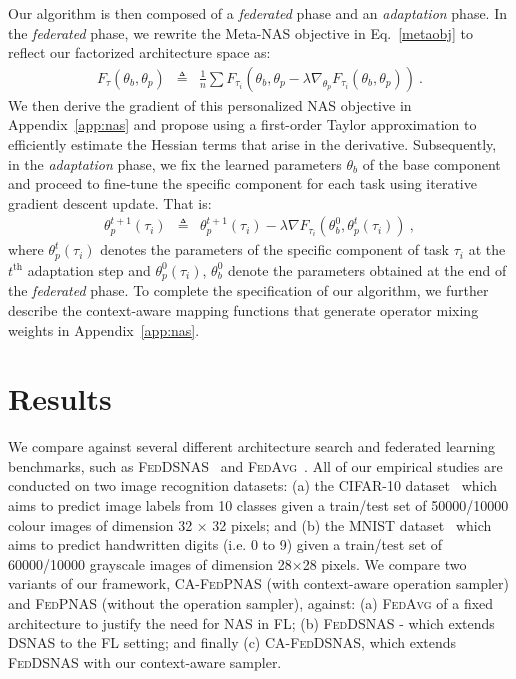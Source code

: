 \noindent Our algorithm is then composed of a \emph{federated} phase and an \emph{adaptation} phase. In the \emph{federated} phase, we rewrite the Meta-NAS objective in Eq.~\eqref{metaobj} to reflect our factorized architecture space as:
\begin{eqnarray}
F_\tau(\theta_b, \theta_p) &\triangleq& \frac{1}{n} \sum F_{\tau_i}\left(\theta_b, \theta_p - \lambda\nabla_{\theta_p} F_{\tau_i}(\theta_b, \theta_p)\right) \ .
\end{eqnarray}
We then derive the gradient of this personalized NAS objective in Appendix~\ref{app:nas} and propose using a first-order Taylor approximation to efficiently estimate the Hessian terms that arise in the derivative. Subsequently, in the \emph{adaptation} phase, we fix the learned parameters $\theta_b$ of the base component and proceed to fine-tune the specific component for each task using iterative gradient descent update. That is:
\begin{eqnarray}
\theta^{t+1}_p(\tau_i) &\triangleq& \theta^{t+1}_p(\tau_i) - \lambda \nabla F_{\tau_i}\left(\theta^0_b, \theta^t_p(\tau_i)\right) \ ,
\end{eqnarray}
where $\theta^{t}_p(\tau_i)$ denotes the parameters of the specific component of task $\tau_i$ at the $t^{\text{th}}$ adaptation step and $\theta^{0}_p(\tau_i)$, $\theta^{0}_b$ denote the parameters obtained at the end of the \emph{federated} phase. To complete the specification of our algorithm, we further describe the context-aware mapping functions that generate operator mixing weights in Appendix~\ref{app:nas}.

\section{Results}
We compare against several different architecture search and federated learning benchmarks, such as \textsc{FedDSNAS}~\cite{he2020fednas} and \textsc{FedAvg}~\cite{McMahan17}. All of our empirical studies are conducted on two image
recognition datasets: (a) the CIFAR-10 dataset~\cite{cifar10} which aims to predict image labels from 10 classes
given a train/test set of 50000/10000 colour images of dimension 32 × 32 pixels; and (b) the MNIST
dataset~\cite{lecun2010mnist} which aims to predict handwritten digits (i.e. 0 to 9) given a train/test set of 60000/10000
grayscale images of dimension 28×28 pixels. We compare two variants of our framework, \textsc{CA-FedPNAS} (with context-aware
operation sampler) and \textsc{FedPNAS} (without the operation sampler), against: (a) \textsc{FedAvg} of a
fixed architecture to justify the need for NAS in FL; (b) \textsc{FedDSNAS} - which extends DSNAS
to the FL setting; and finally (c) \textsc{CA-FedDSNAS}, which extends \textsc{FedDSNAS} with our
context-aware sampler.

